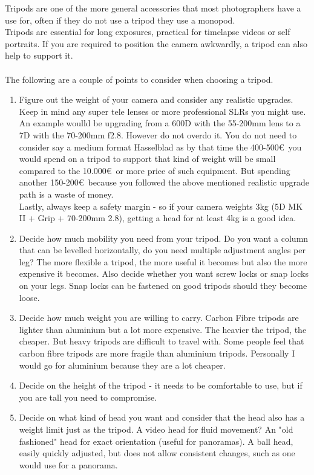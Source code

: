 Tripods are one of the more general accessories that most photographers have a use for, often if they do not use a tripod they use a monopod.
\\
Tripods are essential for long \glspl{exposure}, practical for \gls{timelapse} videos or self portraits. If you are required to position the camera awkwardly, a tripod can also help to support it.
\\
\\
The following are a couple of points to consider when choosing a tripod.
\begin{enumerate}[i]
	\item Figure out the weight of your camera and consider any realistic upgrades.
	\\
	Keep in mind any super tele lenses or more professional SLRs you might use. An example woulld be upgrading from a 600D with the 55-200mm lens to a 7D with the 70-200mm f2.8. However do not overdo it. You do not need to consider say a medium format Hasselblad as by that time the 400-500\euro\ you would spend on a tripod to support that kind of weight will be small compared to the 10.000\euro\ or more price of such equipment. But spending another 150-200\euro\ because you followed the above mentioned realistic upgrade path is a waste of money. 
\\
Lastly, always keep a safety margin - so if your camera weights 3kg (5D MK II + Grip + 70-200mm 2.8), getting a head for at least 4kg is a good idea.
  \item Decide how much mobility you need from your tripod. Do you want a column that can be levelled horizontally, do you need multiple adjustment angles per leg? The more flexible a tripod, the more useful it becomes but also the more expensive it becomes. Also decide whether you want screw locks or snap locks on your legs. Snap locks can be fastened on good tripods should they become loose.
	\item Decide how much weight you are willing to carry. Carbon Fibre tripods are lighter than aluminium but a lot more expensive. The heavier the tripod, the cheaper. But heavy tripods are difficult to travel with.
Some people feel that carbon fibre tripods are more fragile than aluminium tripods. Personally I would go for aluminium because they are a lot cheaper.
	\item Decide on the height of the tripod - it needs to be comfortable to use, but if you are tall you need to compromise.
	\item Decide on what kind of head you want and consider that the head also has a weight limit just as the tripod.
	\subitem A video head for fluid movement?
	\subitem An "old fashioned" head for exact orientation (useful for panoramas).
	\subitem A ball head, easily quickly adjusted, but does not allow consistent changes,  such as one would use for a panorama.
\end{enumerate}

